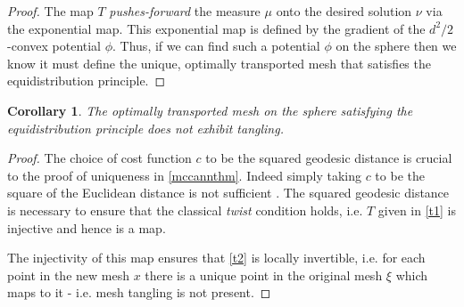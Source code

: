 \documentclass{article}
\newtheorem{corollary}{Corollary}
\theoremstyle{definition}
\begin{document}
\begin{proof}
The map $T$ \textit{pushes-forward} the measure $\mu$ onto the desired solution $\nu$ via the exponential map. This exponential map is defined by the gradient of the $d^2/2$-convex potential $\phi$.
Thus, if we can find such a potential $\phi$ on the sphere then we know it must define the unique, optimally transported mesh that satisfies the equidistribution principle.
\end{proof}

\begin{corollary}
The optimally transported mesh on the sphere satisfying the equidistribution principle does not exhibit tangling.
\end{corollary}
\begin{proof}
The choice of cost function $c$ to be the squared geodesic distance is crucial to the proof of uniqueness in \autoref{mccannthm}. Indeed simply taking $c$ to be the square of the Euclidean distance is not sufficient \citep{ahmad2004}. The squared geodesic distance is necessary to ensure that the classical \emph{twist} condition holds, i.e. $T$ given in \eqref{t1} is injective and hence is a map.

The injectivity of this map ensures that \eqref{t2} is locally invertible, i.e. for each point in the new mesh $x$ there is a unique point in the original mesh $\xi$ which maps to it - i.e. mesh tangling is not present. 
\end{proof}





\end{document}
